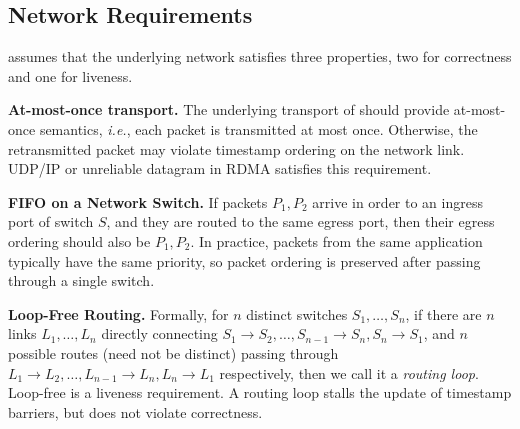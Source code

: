 \subsection{Network Requirements}
\label{sec:assumptions}

\sys assumes that the underlying network satisfies three properties, two for correctness and one for liveness.

\textbf{At-most-once transport.}
The underlying transport of \sys should provide at-most-once semantics, \textit{i.e.}, each packet is transmitted at most once.
Otherwise, the retransmitted packet may violate timestamp ordering on the network link.
UDP/IP or unreliable datagram in RDMA satisfies this requirement.

\textbf{FIFO on a Network Switch.}
If packets $P_1, P_2$ arrive in order to an ingress port of switch $S$, and they are routed to the same egress port, then their egress ordering should also be $P_1, P_2$.
In practice, packets from the same application typically have the same priority, so packet ordering is preserved after passing through a single switch.

\textbf{Loop-Free Routing.}
Formally, for $n$ distinct switches $S_1, \ldots, S_n$, if there are $n$ links $L_1, \ldots, L_n$ directly connecting $S_1 \rightarrow S_2, \ldots, S_{n-1} \rightarrow S_n, S_n \rightarrow S_1$, and $n$ possible routes (need not be distinct) passing through $L_1 \rightarrow L_2, \ldots, L_{n-1} \rightarrow L_n, L_n \rightarrow L_1$ respectively, then we call it a \textit{routing loop}.
Loop-free is a liveness requirement.
A routing loop stalls the update of timestamp barriers, but does not violate correctness.
